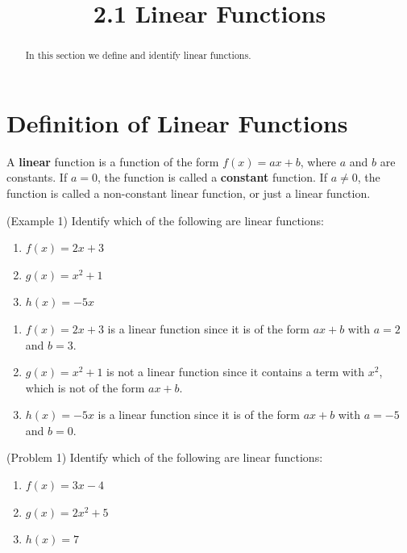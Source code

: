 \documentclass[handout]{ximera}
\title{2.1 Linear Functions}
\begin{document}
\begin{abstract}
In this section we define and identify linear functions.
\end{abstract}

\maketitle


\section{Definition of Linear Functions}
A \textbf{linear} function is a function of the form $f(x) = ax + b$, where $a$ and $b$ are constants. 
If $a = 0$, the function is called a \textbf{constant} function. 
If $a \neq 0$, the function is called a non-constant linear function, or just a linear function. 

\begin{example}(Example 1)
Identify which of the following are linear functions:
\begin{enumerate}
\item $f(x) = 2x + 3$
\item $g(x) = x^2 + 1$
\item $h(x) = -5x$
\end{enumerate}
\begin{solution}
\begin{enumerate}
\item $f(x) = 2x + 3$ is a linear function since it is of the form $ax + b$ with $a = 2$ and $b = 3$.
\item $g(x) = x^2 + 1$ is not a linear function since it contains a term with $x^2$, which is not of the form $ax + b$.
\item $h(x) = -5x$ is a linear function since it is of the form $ax + b$ with $a = -5$ and $b = 0$.
\end{enumerate}
\end{solution}
\end{example}

\begin{problem}(Problem 1)
Identify which of the following are linear functions:
\begin{enumerate}
\item $f(x) = 3x - 4$
\begin{multipleChoice}
\end{multipleChoice}
\item $g(x) = 2x^2 + 5$
\begin{multipleChoice}
\end{multipleChoice}
\item $h(x) = 7$
\begin{multipleChoice}
\end{multipleChoice}
\end{enumerate}
\end{problem}
\end{document}
